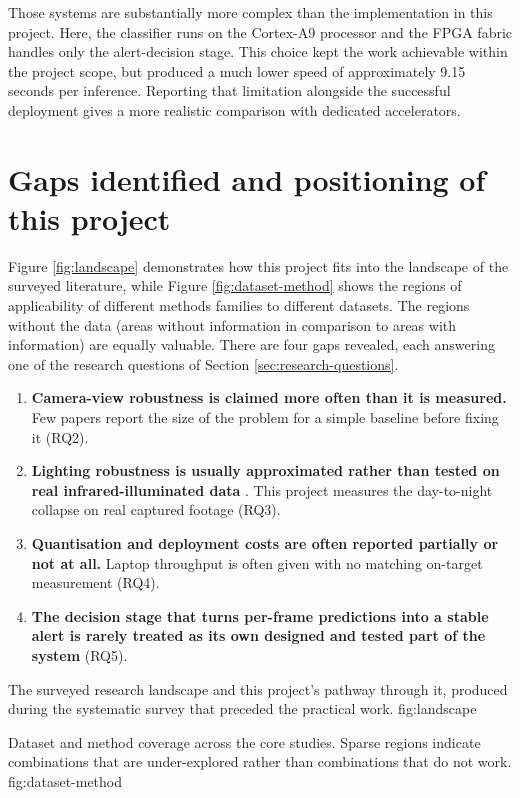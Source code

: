 Those systems are substantially more complex than the implementation in this project. Here, the classifier runs on the Cortex-A9 processor and the FPGA fabric handles only the alert-decision stage. This choice kept the work achievable within the project scope, but produced a much lower speed of approximately 9.15 seconds per inference. Reporting that limitation alongside the successful deployment gives a more realistic comparison with dedicated accelerators.

\section{Gaps identified and positioning of this project}

Figure \ref{fig:landscape} demonstrates how this project fits into the landscape of the surveyed literature, while Figure \ref{fig:dataset-method} shows the regions of applicability of different methods families to different datasets. The regions without the data (areas without information in comparison to areas with information) are equally valuable. There are four gaps revealed, each answering one of the research questions of Section \ref{sec:research-questions}.

\begin{enumerate}[itemsep=0.2em]
	\item \textbf{Camera-view robustness is claimed more often than it is measured.} Few papers report the size of the problem for a simple baseline before fixing it (RQ2).
	\item \textbf{Lighting robustness is usually approximated rather than tested on real infrared-illuminated data} \citep{shen2023visible}. This project measures the day-to-night collapse on real captured footage (RQ3).
	\item \textbf{Quantisation and deployment costs are often reported partially or not at all.} Laptop throughput is often given with no matching on-target measurement (RQ4).
	\item \textbf{The decision stage that turns per-frame predictions into a stable alert is rarely treated as its own designed and tested part of the system} (RQ5).
\end{enumerate}

{The surveyed research landscape and this project's pathway through it, produced during the systematic survey that preceded the practical work.}
{fig:landscape}

{Dataset and method coverage across the core studies. Sparse regions indicate combinations that are under-explored rather than combinations that do not work.}
{fig:dataset-method}

\FloatBarrier
